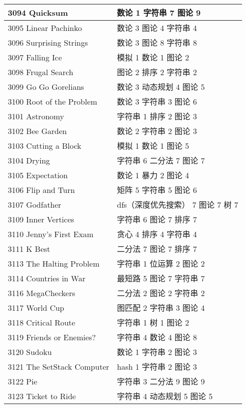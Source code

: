 \begin{longtable}{| p{} | p{} |}
 3094 Quicksum  & 数论 1 字符串 7 图论 9 \\ \hline
 3095 Linear Pachinko  & 数论 3 图论 4 字符串 4 \\ \hline
 3096 Surprising Strings  & 数论 3 图论 8 字符串 8 \\ \hline
 3097 Falling Ice  & 模拟 1 数论 1 图论 2 \\ \hline
 3098 Frugal Search  & 图论 2 排序 2 字符串 2 \\ \hline
 3099 Go Go Gorelians  & 数论 3 动态规划 4 图论 5 \\ \hline
 3100 Root of the Problem  & 数论 3 字符串 3 图论 6 \\ \hline
 3101 Astronomy  & 字符串 1 排序 2 图论 3 \\ \hline
 3102 Bee Garden  & 数论 2 字符串 2 图论 3 \\ \hline
 3103 Cutting a Block  & 模拟 1 数论 1 图论 5 \\ \hline
 3104 Drying  & 字符串 6 二分法 7 图论 7 \\ \hline
 3105 Expectation  & 数论 1 暴力 2 图论 4 \\ \hline
 3106 Flip and Turn  & 矩阵 5 字符串 5 图论 6 \\ \hline
 3107 Godfather  & dfs（深度优先搜索） 7 图论 7 树 7 \\ \hline
 3109 Inner Vertices  & 字符串 6 图论 7 排序 7 \\ \hline
 3110 Jenny's First Exam  & 贪心 4 排序 4 字符串 4 \\ \hline
 3111 K Best  & 二分法 7 图论 7 排序 7 \\ \hline
 3113 The Halting Problem  & 字符串 1 位运算 2 图论 2 \\ \hline
 3114 Countries in War  & 最短路 5 图论 7 字符串 7 \\ \hline
 3116 MegaCheckers  & 二分法 2 图论 2 字符串 2 \\ \hline
 3117 World Cup  & 图匹配 2 字符串 3 图论 4 \\ \hline
 3118 Critical Route  & 字符串 1 树 1 图论 2 \\ \hline
 3119 Friends or Enemies?  & 字符串 4 数论 4 图论 8 \\ \hline
 3120 Sudoku  & 数论 1 字符串 2 图论 3 \\ \hline
 3121 The SetStack Computer  & hash 1 字符串 2 图论 3 \\ \hline
 3122 Pie  & 字符串 3 二分法 9 图论 9 \\ \hline
 3123 Ticket to Ride  & 字符串 4 动态规划 5 图论 5 \\ \hline

\end{longtable}
